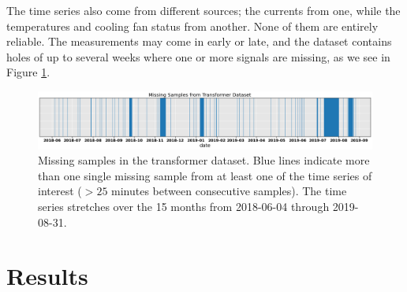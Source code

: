 \documentclass[]{article}
\begin{document}
The time series also come from different sources; the currents from one, while the temperatures and cooling fan status from another. None of them are entirely reliable. The measurements may come in early or late, and the dataset contains holes of up to several weeks where one or more signals are missing, as we see in Figure \ref{fig:missing-samples}.

\begin{figure}[!h]
	\centering
	\includegraphics[width=1\linewidth]{./figs/missing-samples.png}
	\caption{Missing samples in the transformer dataset. Blue lines indicate more than one single missing sample from at least one of the time series of interest ($>25$ minutes between consecutive samples). The time series stretches over the 15 months from 2018-06-04 through 2019-08-31.}
	\label{fig:missing-samples}
\end{figure}




\section{Results} \label{sec:results}
\end{document}
